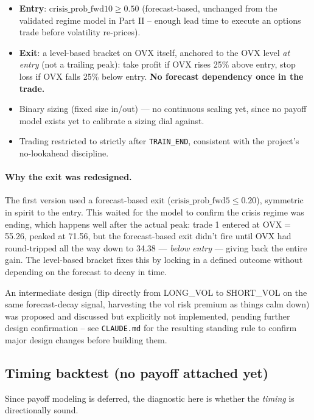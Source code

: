 \documentclass[11pt]{article}
\begin{document}
\begin{itemize}
  \item \textbf{Entry}: $\text{crisis\_prob\_fwd10} \geq 0.50$ (forecast-based,
  unchanged from the validated regime model in Part II -- enough lead time
  to execute an options trade before volatility re-prices).
  \item \textbf{Exit}: a level-based bracket on OVX itself, anchored to the
  OVX level \emph{at entry} (not a trailing peak): take profit if OVX rises
  25\% above entry, stop loss if OVX falls 25\% below entry. \textbf{No
  forecast dependency once in the trade.}
  \item Binary sizing (fixed size in/out) --- no continuous scaling yet,
  since no payoff model exists yet to calibrate a sizing dial against.
  \item Trading restricted to strictly after \texttt{TRAIN\_END}, consistent
  with the project's no-lookahead discipline.
\end{itemize}

\paragraph{Why the exit was redesigned.} The first version used a
forecast-based exit ($\text{crisis\_prob\_fwd5} \leq 0.20$), symmetric in
spirit to the entry. This waited for the model to confirm the crisis
regime was ending, which happens well after the actual peak: trade 1
entered at OVX$=$55.26, peaked at 71.56, but the forecast-based exit didn't
fire until OVX had round-tripped all the way down to 34.38 --- \emph{below
entry} --- giving back the entire gain. The level-based bracket fixes this
by locking in a defined outcome without depending on the forecast to decay
in time.

An intermediate design (flip directly from LONG\_VOL to SHORT\_VOL on the
same forecast-decay signal, harvesting the vol risk premium as things
calm down) was proposed and discussed but explicitly not implemented,
pending further design confirmation -- see \texttt{CLAUDE.md} for the
resulting standing rule to confirm major design changes before building
them.

\subsection{Timing backtest (no payoff attached yet)}
Since payoff modeling is deferred, the diagnostic here is whether the
\emph{timing} is directionally sound.
\end{document}
